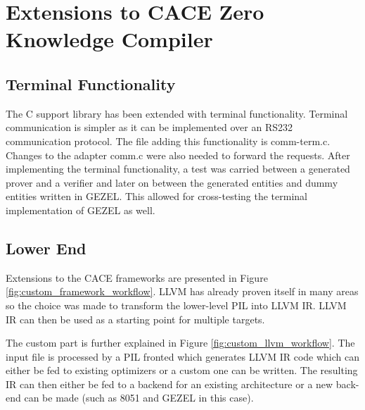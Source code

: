\section{Extensions to CACE Zero Knowledge Compiler}
\label{sec:cace_extensions}

\subsection{Terminal Functionality}

The C support library has been extended with terminal
functionality. Terminal communication is simpler as it can be
implemented over an RS232 communication protocol. The file adding this
functionality is comm-term.c. Changes to the adapter comm.c were also
needed to forward the requests. After implementing the terminal
functionality, a test was carried between a generated prover and a
verifier and later on between the generated entities and dummy
entities written in GEZEL. This allowed for cross-testing the terminal
implementation of GEZEL as well.

\subsection{Lower End}

Extensions to the CACE frameworks are presented in Figure
\ref{fig:custom_framework_workflow}. LLVM has already proven itself in
many areas so the choice was made to transform the lower-level PIL
into LLVM IR. LLVM IR can then be used as a starting point for
multiple targets. 

The custom part is further explained in Figure
\ref{fig:custom_llvm_workflow}. The input file is processed by a PIL
fronted which generates LLVM IR code which can either be fed to
existing optimizers or a custom one can be written. The resulting IR
can then either be fed to a backend for an existing architecture or a
new back-end can be made (such as 8051 and GEZEL in this case).

